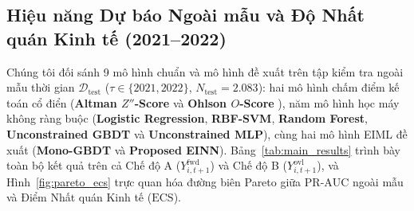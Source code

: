 \documentclass[11pt,a4paper]{article}
\begin{document}
\subsection{Hiệu năng Dự báo Ngoài mẫu và Độ Nhất quán Kinh tế (2021--2022)}
Chúng tôi đối sánh 9 mô hình chuẩn và mô hình đề xuất trên tập kiểm tra ngoài mẫu thời gian $\mathcal{D}_{\text{test}}$ ($\tau \in \{2021, 2022\}$, $N_{\text{test}}=2.083$): hai mô hình chấm điểm kế toán cổ điển (\textbf{Altman $Z''$-Score} \citep{altman1995emerging} và \textbf{Ohlson $O$-Score} \citep{ohlson1980financial}), năm mô hình học máy không ràng buộc (\textbf{Logistic Regression}, \textbf{RBF-SVM}, \textbf{Random Forest}, \textbf{Unconstrained GBDT} và \textbf{Unconstrained MLP}), cùng hai mô hình EIML đề xuất (\textbf{Mono-GBDT} và \textbf{Proposed EINN}). Bảng~\ref{tab:main_results} trình bày toàn bộ kết quả trên cả Chế độ A ($Y_{i,t+1}^{\text{fwd}}$) và Chế độ B ($Y_{i,t+1}^{\text{ovl}}$), và Hình~\ref{fig:pareto_ecs} trực quan hóa đường biên Pareto giữa $\text{PR-AUC}$ ngoài mẫu và Điểm Nhất quán Kinh tế ($\text{ECS}$).
\end{document}
